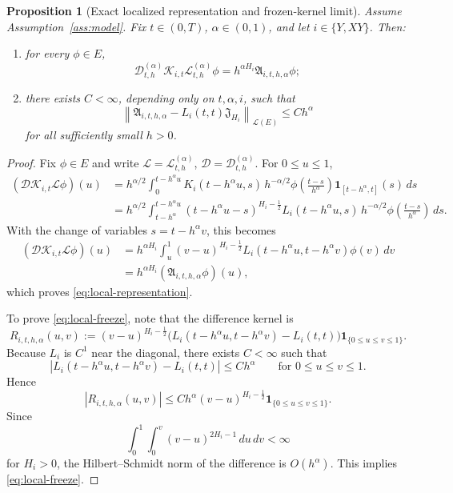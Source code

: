 \documentclass[11pt,a4paper]{amsart}
\theoremstyle{plain}
\newtheorem{proposition}[theorem]{Proposition}
\theoremstyle{definition}
\theoremstyle{remark}
\newcommand{\one}{\mathbf 1}
\begin{document}
\begin{proposition}[Exact localized representation and frozen-kernel limit]
\label{prop:local-volterra}
Assume Assumption~\ref{ass:model}. Fix $t\in(0,T)$, $\alpha\in(0,1)$, and let
$i\in\{Y,XY\}$. Then:
\begin{enumerate}[label=(\roman*)]
\item for every $\phi\in E$,
\begin{equation}\label{eq:local-representation}
\mathcal D_{t,h}^{(\alpha)}\mathcal K_{i,t}\mathcal L_{t,h}^{(\alpha)}\phi
=
h^{\alpha H_i}\mathfrak A_{i,t,h,\alpha}\phi;
\end{equation}
\item there exists $C<\infty$, depending only on $t,\alpha,i$, such that
\begin{equation}\label{eq:local-freeze}
\left\|
\mathfrak A_{i,t,h,\alpha}-L_i(t,t)\mathfrak J_{H_i}
\right\|_{\mathcal L(E)}
\le
Ch^\alpha
\end{equation}
for all sufficiently small $h>0$.
\end{enumerate}
\end{proposition}

\begin{proof}
Fix $\phi\in E$ and write $\mathcal L=\mathcal L_{t,h}^{(\alpha)}$,
$\mathcal D=\mathcal D_{t,h}^{(\alpha)}$. For $0\le u\le 1$,
\begin{align*}
(\mathcal D\mathcal K_{i,t}\mathcal L\phi)(u)
&=
h^{\alpha/2}
\int_0^{t-h^\alpha u}
K_i(t-h^\alpha u,s)\,
h^{-\alpha/2}\phi\!\left(\frac{t-s}{h^\alpha}\right)\one_{[t-h^\alpha,t]}(s)\,ds \\
&=
h^{\alpha/2}
\int_{t-h^\alpha}^{t-h^\alpha u}
(t-h^\alpha u-s)^{H_i-\frac12}
L_i(t-h^\alpha u,s)\,
h^{-\alpha/2}\phi\!\left(\frac{t-s}{h^\alpha}\right)\,ds.
\end{align*}
With the change of variables $s=t-h^\alpha v$, this becomes
\begin{align*}
(\mathcal D\mathcal K_{i,t}\mathcal L\phi)(u)
&=
h^{\alpha H_i}
\int_u^1
(v-u)^{H_i-\frac12}
L_i(t-h^\alpha u,t-h^\alpha v)\phi(v)\,dv \\
&=
h^{\alpha H_i}(\mathfrak A_{i,t,h,\alpha}\phi)(u),
\end{align*}
which proves \eqref{eq:local-representation}.

To prove \eqref{eq:local-freeze}, note that the difference kernel is
\[
R_{i,t,h,\alpha}(u,v)
:=
(v-u)^{H_i-\frac12}
\bigl(L_i(t-h^\alpha u,t-h^\alpha v)-L_i(t,t)\bigr)\one_{\{0\le u\le v\le 1\}}.
\]
Because $L_i$ is $C^1$ near the diagonal, there exists $C<\infty$ such that
\[
|L_i(t-h^\alpha u,t-h^\alpha v)-L_i(t,t)|
\le
Ch^\alpha
\qquad\text{for }0\le u\le v\le 1.
\]
Hence
\[
|R_{i,t,h,\alpha}(u,v)|
\le
Ch^\alpha (v-u)^{H_i-\frac12}\one_{\{0\le u\le v\le 1\}}.
\]
Since
\[
\int_0^1\int_0^v (v-u)^{2H_i-1}\,du\,dv<\infty
\]
for $H_i>0$, the Hilbert--Schmidt norm of the difference is $O(h^\alpha)$. This implies
\eqref{eq:local-freeze}.
\end{proof}
\end{document}
